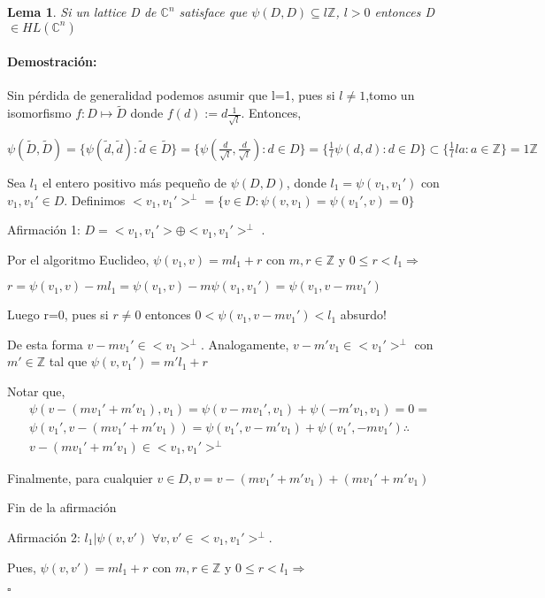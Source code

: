\documentclass[12pt]{article}
\newtheorem{lemma}{Lema}
\newenvironment{proof}{\paragraph{Demostración:}}{\hfill$\square$}
\begin{document}
\begin{lemma} \label{1.7}
 Si un lattice D de $\mathbb{C}^n$  satisface que $\psi(D,D) \subseteq  l \mathbb{Z}$, $l>0$ entonces D $\in HL(\mathbb{C}^n)$
\end{lemma}
\begin{proof}
 Sin pérdida de generalidad podemos asumir que l=1, pues si $l\neq1$,tomo un isomorfismo 
 $f:D \mapsto \tilde{D}$ donde $f(d):=d \frac{1}{\sqrt{l}}$. Entonces,
 
 $\psi(\tilde{D},\tilde{D})=\{ \psi(\tilde{d},\tilde{d}): \tilde{d} \in \tilde{D} \}=
 \{ \psi(\frac{d}{\sqrt{l}},\frac{d}{\sqrt{l}}): d \in D \}=\{ \frac{1}{l} \psi(d,d):d\in D \}
 \subset \{ \frac{1}{l} l a : a \in \mathbb{Z} \}= 1 \mathbb{Z} $
 
 Sea $l_1$ el entero positivo más pequeño de $\psi(D,D)$, donde  $ l_1 = \psi(v_1,v_1')$ con $v_1, v_1' \in D$.
 Definimos $<v_1,v_1'>^\bot=\{v \in D: \psi(v,v_1)=\psi(v_1',v)=0\}$
 \newline
 
 Afirmación 1: $D=<v_1,v_1'>\oplus <v_1,v_1'>^\bot$ .
 
 Por el algoritmo Euclideo, $\psi(v_1,v)=m l_1 +r$ con $m,r \in \mathbb{Z}$ y $0 \leq r < l_1 \Rightarrow $
 
 $r=\psi(v_1,v)-m l_1=\psi(v_1,v)-m \psi(v_1,v_1')=\psi(v_1,v-mv_1')$
 
 
 Luego r=0, pues si $r\neq 0$ entonces $0<\psi(v_1,v-mv_1')<l_1$ absurdo!
 
 De esta forma $v-mv_1' \in <v_1>^\bot$.
 Analogamente, $v-m'v_1 \in <v_1'>^\bot$  con $m'\in \mathbb{Z}$ tal que  $\psi(v,v_1')=m'l_1 + r$
 
 Notar que,
 $$\begin{aligned}
 \psi(v-(m v_1' + m' v_1),v_1)=\psi(v-m v_1',v_1) + \psi(-m' v_1,v_1)=0=\\
 \psi(v_1',v-(m v_1'+m'v_1))=\psi(v_1',v-m'v_1)+ \psi(v_1',-m v_1') \therefore \\
 v-(m v_1'+m'v_1) \in <v_1,v_1'>^\bot
 \end{aligned}$$
 
 Finalmente, para cualquier $v\in D, v=v-(m v_1'+ m'v_1)+(m v_1' + m'v_1)$ 
 
 Fin de la afirmación 
 \newline
 
 Afirmación 2: $l_1 | \psi(v,v')$ $\forall v,v' \in <v_1,v_1'>^\bot$.
 
 Pues, $\psi(v,v')=m l_1 + r$ con $m,r \in \mathbb{Z}$ y  $0\leq r < l_1 \Rightarrow $
 

\end{proof}
\end{document}

